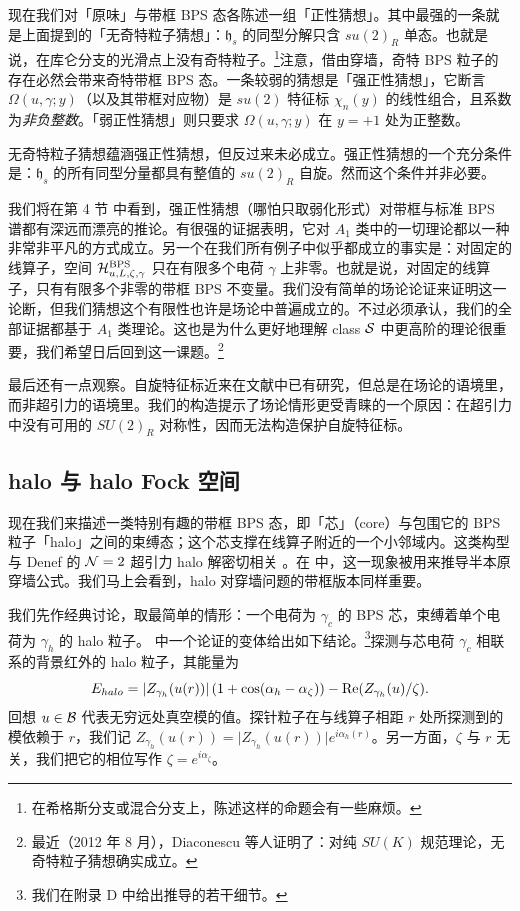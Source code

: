 现在我们对「原味」与带框 BPS 态各陈述一组「正性猜想」。其中最强的一条就是上面提到的「无奇特粒子猜想」：$\mathfrak{h}_s$ 的同型分解只含 $su(2)_R$ 单态。也就是说，在库仑分支的光滑点上没有奇特粒子。\footnote{在希格斯分支或混合分支上，陈述这样的命题会有一些麻烦。}注意，借由穿墙，奇特 BPS 粒子的存在必然会带来奇特带框 BPS 态。一条较弱的猜想是「强正性猜想」，它断言 $\Omega(u,\gamma;y)$（以及其带框对应物）是 $su(2)$ 特征标 $\chi_n(y)$ 的线性组合，且系数为\emph{非负整数}。「弱正性猜想」则只要求 $\Omega(u,\gamma;y)$ 在 $y=+1$ 处为正整数。

无奇特粒子猜想蕴涵强正性猜想，但反过来未必成立。强正性猜想的一个充分条件是：$\mathfrak{h}_s$ 的所有同型分量都具有整值的 $su(2)_R$ 自旋。然而这个条件并非必要。

我们将在第 4 节%
中看到，强正性猜想（哪怕只取弱化形式）对带框与标准 BPS 谱都有深远而漂亮的推论。有很强的证据表明，它对 $A_1$ 类中的一切理论都以一种非常非平凡的方式成立。另一个在我们所有例子中似乎都成立的事实是：对固定的线算子，空间 $\mathcal{H}_{u,L,\zeta,\gamma}^{\rm BPS}$ 只在有限多个电荷 $\gamma$ 上非零。也就是说，对固定的线算子，只有有限多个非零的带框 BPS 不变量。我们没有简单的场论论证来证明这一论断，但我们猜想这个有限性也许是场论中普遍成立的。不过必须承认，我们的全部证据都基于 $A_1$ 类理论。这也是为什么更好地理解 class $\mathcal{S}$ 中更高阶的理论很重要，我们希望日后回到这一课题。\footnote{最近（2012 年 8 月），Diaconescu 等人证明了：对纯 $SU(K)$ 规范理论，无奇特粒子猜想确实成立。}

最后还有一点观察。自旋特征标近来在文献中已有研究，但总是在场论的语境里，而非超引力的语境里。我们的构造提示了场论情形更受青睐的一个原因：在超引力中没有可用的 $SU(2)_R$ 对称性，因而无法构造保护自旋特征标。

\subsection{halo 与 halo Fock 空间}
\label{subsec:Halos}

现在我们来描述一类特别有趣的带框 BPS 态，即「芯」（core）与包围它的 BPS 粒子「halo」之间的束缚态；这个芯支撑在线算子附近的一个小邻域内。这类构型与 Denef 的 $\mathcal{N}=2$ 超引力 halo 解密切相关 \cite{Denef:2000nb,Denef:2000ar,Denef:2002ru}。在 \cite{Denef:2007vg} 中，这一现象被用来推导半本原穿墙公式。我们马上会看到，halo 对穿墙问题的带框版本同样重要。

我们先作经典讨论，取最简单的情形：一个电荷为 $\gamma_c$ 的 BPS 芯，束缚着单个电荷为 $\gamma_h$ 的 halo 粒子。\cite{Denef:2000nb} 中一个论证的变体给出如下结论。\footnote{我们在附录 D 中给出推导的若干细节。%
}探测与芯电荷 $\gamma_c$ 相联系的背景红外的 halo 粒子，其能量为
\begin{equation}\label{eq:Halo-Particle-Energy}
E_{halo} = \vert Z_{\gamma_h}(u(r))\vert \left(1 + \cos(\alpha_h -
\alpha_\zeta)\right) -  {\rm Re}(Z_{\gamma_h}(u)/\zeta).
\end{equation}
回想 $u \in \mathcal{B}$ 代表无穷远处真空模的值。探针粒子在与线算子相距 $r$ 处所探测到的模依赖于 $r$，我们记 $Z_{\gamma_h}(u(r)) =\vert Z_{\gamma_h}(u(r))\vert e^{i\alpha_h(r)}$。另一方面，$\zeta$ 与 $r$ 无关，我们把它的相位写作 $\zeta = e^{i \alpha_\zeta}$。

